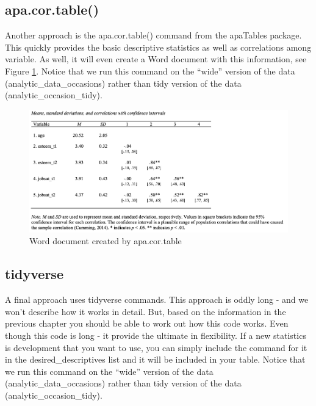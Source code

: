 \documentclass[
]{krantz}
\makeatletter
\newenvironment{Shaded}{\begin{snugshade}}{\end{snugshade}}
\newcommand{\DataTypeTok}[1]{\textcolor[rgb]{0.27,0.27,0.27}{#1}}
\newcommand{\KeywordTok}[1]{\textcolor[rgb]{0.27,0.27,0.27}{\textbf{#1}}}
\newcommand{\NormalTok}[1]{#1}
\newcommand{\OperatorTok}[1]{\textcolor[rgb]{0.43,0.43,0.43}{\textbf{#1}}}
\newcommand{\StringTok}[1]{\textcolor[rgb]{0.5,0.5,0.5}{#1}}
\newenvironment{kframe}{%
\medskip{}
\setlength{\fboxsep}{.8em}
 \def\at@end@of@kframe{}%
 \ifinner\ifhmode%
  \def\at@end@of@kframe{\end{minipage}}%
  \begin{minipage}{\columnwidth}%
 \fi\fi%
 \def\FrameCommand##1{\hskip\@totalleftmargin \hskip-\fboxsep
 \colorbox{shadecolor}{##1}\hskip-\fboxsep
     \hskip-\linewidth \hskip-\@totalleftmargin \hskip\columnwidth}%
 \MakeFramed {\advance\hsize-\width
   \@totalleftmargin\z@ \linewidth\hsize
   \@setminipage}}%
 {\par\unskip\endMakeFramed%
 \at@end@of@kframe}
\renewenvironment{Shaded}{\begin{kframe}}{\end{kframe}}
\makeatother
\begin{document}
\hypertarget{apa.cor.table}{%
\subsection{apa.cor.table()}\label{apa.cor.table}}

Another approach is the apa.cor.table() command from the apaTables package. This quickly provides the basic descriptive statistics as well as correlations among variable. As well, it will even create a Word document with this information, see Figure \ref{fig:descapa}. Notice that we run this command on the ``wide'' version of the data (analytic\_data\_occasions) rather than tidy version of the data (analytic\_occasion\_tidy).

\begin{Shaded}
\end{Shaded}

\begin{figure}
\includegraphics[width=1\linewidth]{ch_enter_load/images/desc_apa} \caption{Word document created by apa.cor.table}\label{fig:descapa}
\end{figure}

\hypertarget{tidyverse}{%
\subsection{tidyverse}\label{tidyverse}}

A final approach uses tidyverse commands. This approach is oddly long - and we won't describe how it works in detail. But, based on the information in the previous chapter you should be able to work out how this code works. Even though this code is long - it provide the ultimate in flexibility. If a new statistics is development that you want to use, you can simply include the command for it in the desired\_descriptives list and it will be included in your table. Notice that we run this command on the ``wide'' version of the data (analytic\_data\_occasions) rather than tidy version of the data (analytic\_occasion\_tidy).
\end{document}
